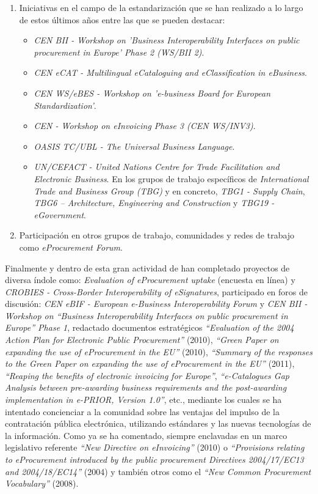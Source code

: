 \begin{enumerate}
\item Iniciativas en el campo de la estandarización que se han realizado
a lo largo de estos últimos años entre las que se pueden destacar:
\begin{itemize}
 \item \textit{CEN BII - Workshop on 'Business Interoperability Interfaces on public procurement in Europe' Phase 2 (WS/BII 2)}.
\item \textit{CEN eCAT - Multilingual eCataloguing and eClassification in eBusiness}.
\item \textit{CEN WS/eBES - Workshop on 'e-business Board for European Standardization'}.
\item \textit{CEN - Workshop on eInvoicing Phase 3 (CEN WS/INV3)}.
\item \textit{OASIS TC/UBL - The Universal Business Language}.
 \item \textit{UN/CEFACT - United Nations Centre for Trade Facilitation and Electronic Business}. En los grupos de trabajo
específicos de \textit{International Trade and Business Group (TBG)} y en concreto, \textit{TBG1 - Supply Chain},
\textit{TBG6 – Architecture, Engineering and Construction} y \textit{TBG19 - \gls{eGovernment}}.
\end{itemize}

\item Participación en otros grupos de trabajo, comunidades y redes de trabajo como \textit{eProcurement Forum}.
\end{enumerate}

Finalmente y dentro de esta gran actividad de han completado proyectos de diversa índole como:
\textit{Evaluation of eProcurement uptake} (encuesta en línea) y \textit{CROBIES - Cross-Border Interoperability of eSignatures},
participado en foros de discusión: \textit{CEN eBIF - European e-Business Interoperability Forum} y
\textit{CEN BII - Workshop on ``Business Interoperability Interfaces on public procurement in Europe'' Phase 1}, redactado
documentos estratégicos \textit{``Evaluation of the 2004 Action Plan for Electronic Public Procurement''} (2010),
\textit{``Green Paper on expanding the use of eProcurement in the EU''} (2010), 
\textit{``Summary of the responses to the Green Paper on expanding the use of eProcurement in the EU''} (2011), 
\textit{``Reaping the benefits of electronic invoicing for Europe''}, \textit{``e-Catalogues Gap Analysis between pre-awarding business requirements 
and the post-awarding implementation in e-PRIOR, Version 1.0''}, etc., mediante los cuales se ha intentado
concienciar a la comunidad sobre las ventajas del impulso de la contratación pública electrónica, utilizando
estándares y las nuevas tecnologías de la información. Como ya se ha comentado, siempre enclavadas en un marco
legislativo referente \textit{``New Directive on eInvoicing''} (2010) o 
\textit{``Provisions relating to eProcurement introduced by the public procurement Directives 2004/17/EC13 and 2004/18/EC14''} (2004) y también
otros como el \textit{``New Common Procurement Vocabulary''} (2008).

